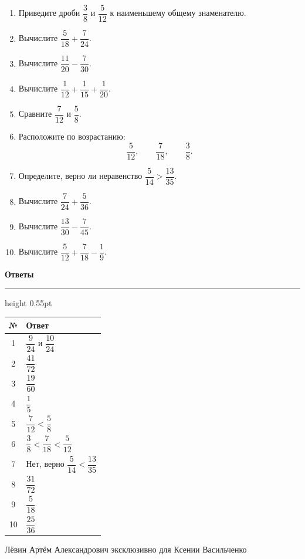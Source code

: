 \documentclass[a4paper,12pt]{article}
\newcommand{\sectiontitle}[1]{%
  \vspace{0.2em}%
  {\large\bfseries\color{darkaccent}#1}\par
  \vspace{0.08em}\hrule height 0.55pt\vspace{0.42em}%
}
\begin{document}
\begin{enumerate}
  \item Приведите дроби $\dfrac38$ и $\dfrac5{12}$ к наименьшему общему знаменателю.

  \item Вычислите $\dfrac5{18}+\dfrac7{24}$.

  \item Вычислите $\dfrac{11}{20}-\dfrac7{30}$.

  \item Вычислите $\dfrac1{12}+\dfrac1{15}+\dfrac1{20}$.

  \item Сравните $\dfrac7{12}$ и $\dfrac58$.

  \item Расположите по возрастанию:
  \[
  \frac5{12},\qquad \frac7{18},\qquad \frac38.
  \]

  \item Определите, верно ли неравенство $\dfrac5{14}>\dfrac{13}{35}$.

  \item Вычислите $\dfrac7{24}+\dfrac5{36}$.

  \item Вычислите $\dfrac{13}{30}-\dfrac7{45}$.

  \item Вычислите $\dfrac5{12}+\dfrac7{18}-\dfrac19$.
\end{enumerate}

\clearpage

\sectiontitle{Ответы}

\renewcommand{\arraystretch}{1.35}
\begin{center}
\begin{tabularx}{0.96\linewidth}{@{}cX@{}}
\toprule
\textbf{№} & \textbf{Ответ} \\
\midrule
1 & $\dfrac9{24}$ и $\dfrac{10}{24}$ \\
2 & $\dfrac{41}{72}$ \\
3 & $\dfrac{19}{60}$ \\
4 & $\dfrac15$ \\
5 & $\dfrac7{12}<\dfrac58$ \\
6 & $\dfrac38<\dfrac7{18}<\dfrac5{12}$ \\
7 & Нет, верно $\dfrac5{14}<\dfrac{13}{35}$ \\
8 & $\dfrac{31}{72}$ \\
9 & $\dfrac5{18}$ \\
10 & $\dfrac{25}{36}$ \\
\bottomrule
\end{tabularx}
\end{center}

\vfill
{\small\color{textgray}Лёвин Артём Александрович эксклюзивно для Ксении Васильченко}
\end{document}
